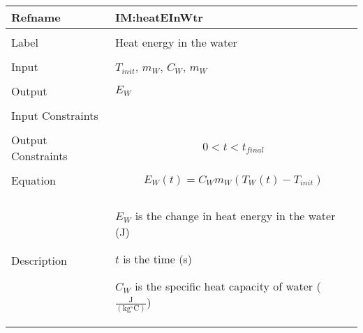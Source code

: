 \documentclass[12pt]{article}
\begin{document}
 \noindent \begin{minipage}{\textwidth}
\begin{tabular}{p{} p{}}
\toprule \textbf{Refname} & \textbf{IM:heatEInWtr}
\label{IM:heatEInWtr}
\\ \midrule \\
Label & Heat energy in the water
        \\ \midrule \\
        Input & ${T_{init}}$, ${m_{W}}$, ${C_{W}}$, ${m_{W}}$
                \\ \midrule \\
                Output & ${E_{W}}$
                         \\ \midrule \\
                         Input Constraints & \\ \midrule \\
                                             Output Constraints & \begin{displaymath}
                                                                  0<t<{t_{final}}
                                                                  \end{displaymath}
                                                                  \\ \midrule \\
                                                                  Equation & \begin{displaymath}
                                                                             {E_{W}}\left(t\right)={C_{W}} {m_{W}} \left({T_{W}}\left(t\right)-{T_{init}}\right)
                                                                             \end{displaymath}
                                                                             \\ \midrule \\
                                                                             Description & \begin{symbDescription}
                                                                                           \item{${E_{W}}$ is the change in heat energy in the water (J)}
                                                                                           \item{$t$ is the time (s)}
                                                                                           \item{${C_{W}}$ is the specific heat capacity of water ($\frac{\text{J}}{(\text{kg}{}^{\circ}\text{C})}$)}

\end{symbDescription}
\end{tabular}
\end{minipage}
\end{document}
